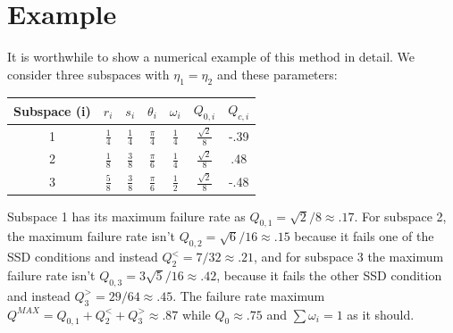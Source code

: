 \documentclass[12pt,oneside,english,reqno]{amsbook}
\numberwithin{section}{chapter}
\numberwithin{equation}{section}
\numberwithin{figure}{section}
\begin{document}


\section{Example}

It is worthwhile to show a numerical example of this method in detail.  We consider three subspaces with $\eta_1 = \eta_2$ and these parameters:
\begin{table}[th] 
\centering %
\begin{tabular}{c c c c c c c} %
Subspace (i)&$r_i$ &$s_i$ &$\theta_i$&$\omega_i$ &$Q_{0,i}$ & $Q_{c,i}$\\ [0.5ex] %
\hline %
1 & $\frac{1}{4}$ &$\frac{1}{4}$ &$ \frac{\pi}{4}$ &$\frac{1}{4}$&$\frac{\sqrt{2}}{8}$ & -.39  \\ %
2 & $\frac{1}{8}$ &$\frac{3}{8}$  &$\frac{\pi}{6}$ &$\frac{1}{4}$&$\frac{\sqrt{2}}{8}$ & .48\\ 
3 &$\frac{5}{8}$  & $\frac{3}{8}$  &$\frac{\pi}{6}$ &$\frac{1}{2}$&$\frac{\sqrt{2}}{8}$ &-.48  \\  [1ex] %
\hline %
\end{tabular} 
\label{table:example} %
\end{table} 

Subspace 1 has its maximum failure rate as $Q_{0,1} = \sqrt{2}/8 \approx .17$. For subspace 2, the maximum failure rate isn't $Q_{0,2} = \sqrt{6}/16 \approx .15$ because it fails one of the SSD conditions and instead $Q^{<}_2 =7/32 \approx .21$, and for subspace 3 the maximum failure rate isn't $Q_{0,3} = 3 \sqrt{5}/16 \approx .42$, because it fails the other SSD condition and instead $Q^{>}_3 = 29/64 \approx .45$. The failure rate maximum $Q^{MAX} = Q_{0,1} +Q^{<}_2 +Q^{>}_3 \approx .87$ while $Q_0 \approx .75$
and $\sum \omega_i = 1$ as it should.
\end{document}
